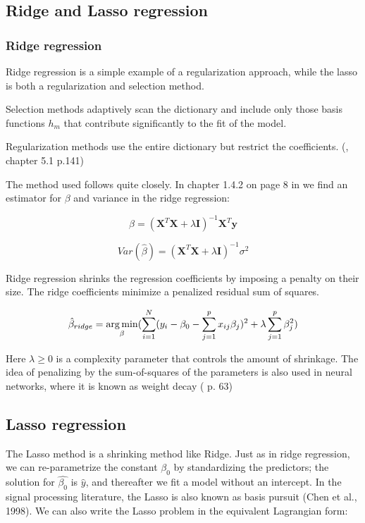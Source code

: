 \subsection{Ridge and Lasso regression}

\subsubsection*{Ridge regression}
Ridge regression is a simple example of a regularization approach, while the lasso is both a regularization and selection method. 

Selection methods adaptively scan the dictionary and include only those basis functions $h_m$ that contribute significantly to the fit of
the model.

Regularization methods use the entire dictionary but restrict the coefficients.  (\cite{elementsstat}, chapter 5.1 p.141)

The method used follows \cite{ridge} quite closely. In chapter 1.4.2 on page 8 in \cite{ridge} we find an estimator for $\beta$ and variance in the ridge regression:


\begin{equation*}
\beta=(\textbf{X}^T\textbf{X}+\lambda\textbf{I})^{-1}\textbf{X}^T\textbf{y}
\end{equation*}

\medskip
\begin{equation*}
Var(\hat{\beta}) =(\textbf{X}^T\textbf{X}+\lambda\textbf{I})^{-1}\sigma^2
\end{equation*}
\medskip

Ridge regression shrinks the regression coefficients by imposing a penalty on their size. The ridge coefficients minimize a penalized residual sum of squares.


\begin{equation}
\hat{\beta}_{ridge} =\operatorname*{arg\,min}_{\beta}({\sum_{i=1}^{N}(y_i - \beta_0 -\sum_{j=1}^{p}x_{ij}\beta_j)^2 + \lambda \sum_{j=1}^{p}\beta_j^2})
\end{equation}
\medskip

Here $\lambda\ge 0 $ is a complexity parameter that controls the amount of shrinkage. The idea of penalizing by the sum-of-squares of the parameters is also used in neural networks,
where it is known as weight decay (\cite{elementsstat} p. 63)

\subsection*{Lasso regression}
The Lasso method is a shrinking method like Ridge. Just as in ridge regression, we can re-parametrize the constant $\beta_0$ by standardizing the predictors; the solution for $\hat{\beta_0}$ is $\hat{y}$, and thereafter we fit a model without an intercept. In the signal processing literature,
the Lasso is also known as basis pursuit (Chen et al., 1998).
We can also write the Lasso problem in the equivalent Lagrangian form:

